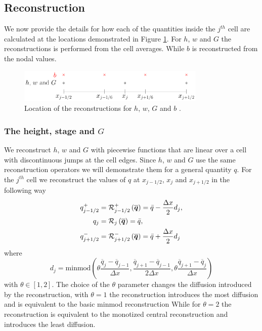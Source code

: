 \setcounter{subsection}{0}
\renewcommand{\thesubsection}{(\roman{subsection})} 
\subsection{Reconstruction}
We now provide the details for how each of the quantities inside the $j^{th}$ cell are calculated at the locations demonstrated in Figure \ref{fig:ReconLocs}. For $h$, $w$ and $G$ the reconstructions is performed from the cell averages. While $b$ is reconstructed from the nodal values.

\begin{figure}
	\centering
	\includegraphics[width=0.8\textwidth]{./chp3/figures/FEVMRecon.pdf}
	\caption{Location of the reconstructions for $h$, $w$, $G$ and $b$ .}
	\label{fig:ReconLocs}
\end{figure}

\subsubsection{The height, stage and $G$}
We reconstruct $h$, $w$ and $G$ with piecewise functions that are linear over a cell with discontinuous jumps at the cell edges. Since $h$, $w$ and $G$ use the same reconstruction operators we will demonstrate them for a general quantity $q$. For the $j^{th}$ cell we reconstruct the values of $q$ at $x_{j-1/2} $, $x_{j} $ and $x_{j+1/2}$ in the following way
\begin{subequations}
	\begin{align}
	q^+_{j-1/2} & = \mathcal{R}^+_{j-1/2} \left(\overline{\boldsymbol{q}}\right) = \bar{q} - \dfrac{\Delta x}{2} d_j, \\
	q_{j} &= \mathcal{R}_{j} \left(\overline{\boldsymbol{q}}\right) =\bar{q} ,\\
	q^-_{j+1/2} &= \mathcal{R}^-_{j+1/2} \left(\overline{\boldsymbol{q}}\right) = \bar{q} + \dfrac{\Delta x}{2} d_j
	\end{align}
	\label{eqn:ReconforhwG}
\end{subequations}
where 
\begin{equation}
d_j = \text{minmod}\left(\theta \dfrac{\overline{q}_j -\overline{q}_{j-1} }{\Delta x}, \dfrac{\overline{q}_{j+1} -\overline{q}_{j-1} }{2\Delta x}, \theta\dfrac{\overline{q}_{j+1} -\overline{q}_{j} }{\Delta x}\right)
\label{eqn:slopehGrecon}
\end{equation}
with $\theta \in \left[1,2\right]$. The choice of the $\theta$ parameter changes the diffusion introduced by the reconstruction, with $\theta =1$ the reconstruction introduces the most diffusion and is equivalent to the basic minmod reconstruction \cite{Roe-1986-337} While for $\theta = 2$ the reconstruction is equivalent to the monotized central reconstruction \citealp{VanLeer-1977-276} and introduces the least diffusion.

